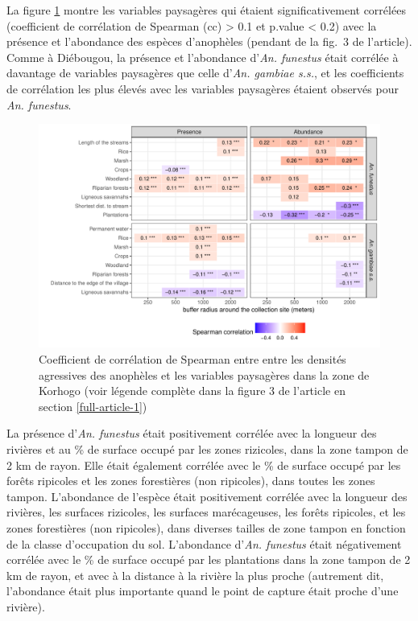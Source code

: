 \documentclass[12pt,twoside]{reedthesis}
\begin{document}
La figure \ref{fig:spbuffer-ci} montre les variables paysagères qui étaient significativement corrélées (coefficient de corrélation de Spearman (cc) \textgreater{} 0.1 et p.value \textless{} 0.2) avec la présence et l'abondance des espèces d'anophèles (pendant de la fig.~3 de l'article). Comme à Diébougou, la présence et l'abondance d'\emph{An. funestus} était corrélée à davantage de variables paysagères que celle d'\emph{An. gambiae s.s.}, et les coefficients de corrélation les plus élevés avec les variables paysagères étaient observés pour \emph{An. funestus}.
\begin{figure}

{\centering \includegraphics[width=1\linewidth]{figure/spatialbuffer_ci} 

}

\caption[Coefficient de corrélation de Spearman entre entre les densités agressives des anophèles et les variables paysagères dans la zone de Korhogo]{Coefficient de corrélation de Spearman entre entre les densités agressives des anophèles et les variables paysagères dans la zone de Korhogo (voir légende complète dans la figure 3 de l'article en section \ref{full-article-1})}\label{fig:spbuffer-ci}
\end{figure}
La présence d'\emph{An. funestus} était positivement corrélée avec la longueur des rivières et au \% de surface occupé par les zones rizicoles, dans la zone tampon de 2 km de rayon. Elle était également corrélée avec le \% de surface occupé par les forêts ripicoles et les zones forestières (non ripicoles), dans toutes les zones tampon. L'abondance de l'espèce était positivement corrélée avec la longueur des rivières, les surfaces rizicoles, les surfaces marécageuses, les forêts ripicoles, et les zones forestières (non ripicoles), dans diverses tailles de zone tampon en fonction de la classe d'occupation du sol. L'abondance d'\emph{An. funestus} était négativement corrélée avec le \% de surface occupé par les plantations dans la zone tampon de 2 km de rayon, et avec à la distance à la rivière la plus proche (autrement dit, l'abondance était plus importante quand le point de capture était proche d'une rivière).\\
\end{document}
